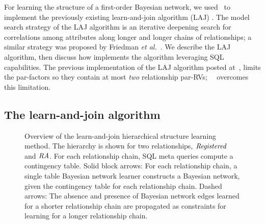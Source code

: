 For learning the structure of a first-order Bayesian network, we used \FB\ to implement the previously existing learn-and-join algorithm (LAJ) \cite{Khosravi2010,Schulte2012}. 
%
The model search strategy of the LAJ algorithm is an iterative deepening search for correlations among attributes along longer and longer chains of relationships; a similar strategy was proposed by Friedman {\em et al.}~\cite{friedman1999learning}.
We describe the LAJ algorithm, then discuss how \FB implements the algorithm leveraging SQL capabilities. The previous implementation of the LAJ algorithm posted at~\cite{bib:bbsite}, limits the par-factors so they contain at most {\em two} relationship par-RVs; ~\FB\ overcomes this limitation.

\subsection{The learn-and-join algorithm}

\begin{figure}[htbp] %
 \centering
{} 
\caption{Overview of the learn-and-join hierarchical structure learning method. The hierarchy is shown for 
two relationships, $\it{Registered}$ and $\it{RA}$. For each relationship chain, SQL meta queries compute a contingency table. Solid block arrows: For each relationship chain, a single table Bayesian network learner constructs a Bayesian network, given the contingency table for each relationship chain. Dashed arrows: The absence and presence of Bayesian network edges learned for a shorter relationship chain are propagated as constraints for learning for a longer relationship chain.}
 \label{fig:lattice}
\end{figure}


